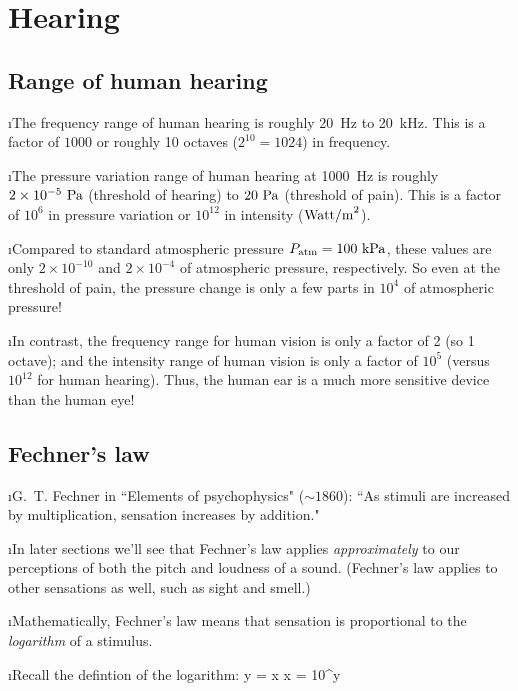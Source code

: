 \section{Hearing}

\subsection{Range of human hearing}
\bi

\i The frequency range of human hearing is roughly
20~Hz to 20~kHz.
This is a factor of $1000$ or roughly 10 octaves
($2^{10} = 1024$) in frequency.

\i The pressure variation range of human hearing at 1000~Hz is
roughly $2\times 10^{-5}~{\rm Pa}$ (threshold of hearing)
to $20~{\rm Pa}$ (threshold of pain).
This is a factor of $10^6$ in pressure variation or $10^{12}$
in intensity (${\rm Watt/m}^2$).

\i Compared to standard atmospheric pressure $P_{\rm atm} = 100~{\rm kPa}$,
these values are only $2\times 10^{-10}$ and
$2\times 10^{-4}$ of atmospheric pressure, respectively.
So even at the threshold of pain, the pressure change is only a few 
parts in $10^4$ of atmospheric pressure!

\i In contrast, the frequency range for human vision is
only a factor of 2 (so 1 octave);
and the intensity range of human vision is only a factor of
$10^5$ (versus $10^{12}$ for human hearing).
Thus, the human ear is a much more sensitive device than the
human eye!

\ei
\subsection{Fechner's law}
\bi

\i G.~T. Fechner in ``Elements of psychophysics" ($\sim 1860$):
``As stimuli are increased by multiplication, sensation
increases by addition."

\i In later sections we'll see that Fechner's law 
applies
{\em approximately} to our perceptions of both the 
pitch and loudness of a sound.
(Fechner's law applies to other sensations as well, 
such as sight and smell.)

\i Mathematically, Fechner's law means that sensation is 
proportional to the {\em logarithm} of a stimulus.

\i Recall the defintion of the logarithm:%
%
\be
y = \log x
\quad
\Leftrightarrow
\quad
x = 10^y
\ee
%

